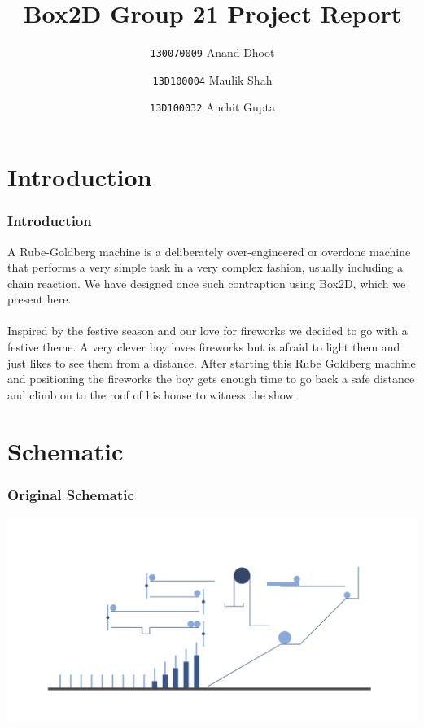 \title{Box2D Group 21 Project Report}
\author
{
  \texttt{130070009}
  Anand Dhoot\\
  \and
  \texttt{13D100004}
  Maulik Shah\\
  \and
  \texttt{13D100032}
  Anchit Gupta\\
}
\maketitle

\newif\iflattersubsect
\lattersubsecttrue

\AtBeginSection[]
{
	\iflattersubsect
   \begin{frame}
       \frametitle{Overview}
       \tableofcontents[sections]
   \end{frame}
   \fi
   \lattersubsectfalse
}

\section{Introduction}
\begin{frame}
\frametitle{Introduction}
A Rube-Goldberg machine is a deliberately over-engineered or overdone machine that performs a very simple task in a very complex fashion, usually including a chain reaction. We have designed once such contraption using Box2D, which we present here. 
\pause
\\
\\
Inspired by the festive season and our love for fireworks we decided to go with a festive theme. A very clever boy loves fireworks but is
afraid to light them and just likes to see them from a distance. After starting this Rube Goldberg machine and positioning the fireworks the boy gets enough time to go back a safe distance and climb on to the roof of his house to witness the show. 
\end{frame}

\section{Schematic}
\begin{frame}
\frametitle{Original Schematic}
\begin{center}
\includegraphics[scale=1.1]{./Images/rect3049.png}
\end{center}
\end{frame}

